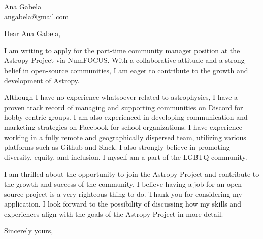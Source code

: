 \documentclass[
	parskip=half, %
	enlargefirstpage=true, %
]{scrlttr2} %
\begin{document}

\begin{letter}{
	Ana Gabela \\
	angabela@gmail.com
}

\opening{Dear Ana Gabela,}

I am writing to apply for the part-time community manager position at the
Astropy Project via NumFOCUS. With a collaborative attitude and a strong belief in
open-source communities, I am eager to contribute to the growth and development
of Astropy.

Although I have no experience whatsoever related to astrophysics,
I have a proven track record of managing and
supporting communities on Discord for hobby centric groups. I am also experienced in
developing communication and marketing strategies on Facebook for school organizations.
I have experience working in a fully remote and geographically dispersed team,
utilizing various platforms such as Github and Slack. I also strongly believe in promoting diversity, equity, and inclusion.
I myself am a part of the LGBTQ community.

I am thrilled about the opportunity to join the Astropy Project and contribute
to the growth and success of the community. I believe having a job for an
open-source project is a very righteous thing to do. Thank you for considering
my application. I look forward to the possibility of discussing how my skills and
experiences align with the goals of the Astropy Project in more detail.

Sincerely yours, \\


\end{letter}
\end{document}
